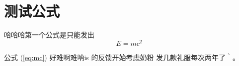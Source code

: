 \chapter{测试公式}
    哈哈哈第一个公式是只能发出
    \begin{equation}
        E=mc^2 \label{eq:mc}
    \end{equation}

    公式 (\ref{eq:mc}) 好难啊难呐is 的反馈开始考虑奶粉
    发几款礼服每次两年了｀。
\label{chap:测试公式}

